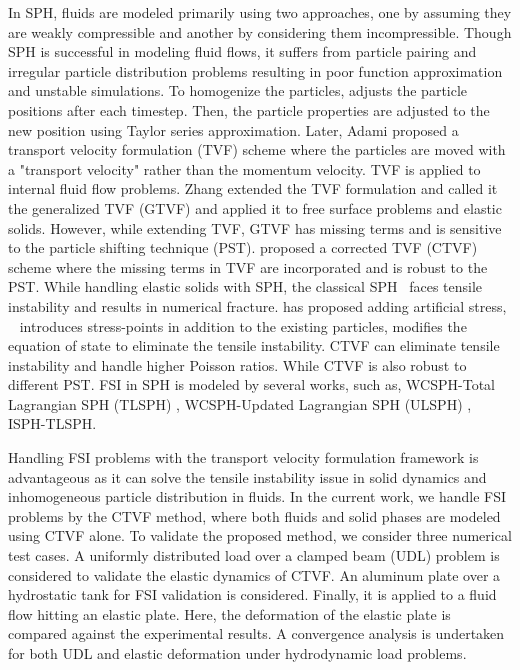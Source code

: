 \documentclass[10pt, conference]{FMFP2022}
\begin{document}
In SPH, fluids are modeled primarily using two approaches, one by assuming they
are weakly compressible and another by considering them incompressible. Though
SPH is successful in modeling fluid flows, it suffers from particle pairing and
irregular particle distribution problems resulting in poor function
approximation~\cite{rastelli2022implicit} and unstable simulations. To
homogenize the particles, \cite{xu2009accuracy} adjusts the particle positions
after each timestep. Then, the particle properties are adjusted to the new
position using Taylor series approximation. Later, Adami \cite{adami2013transport}
proposed a transport velocity formulation (TVF) scheme where the particles are
moved with a "transport velocity" rather than the momentum velocity. TVF is
applied to internal fluid flow problems. Zhang
\cite{zhang2017generalized} extended the TVF formulation and called it the
generalized TVF (GTVF) and applied it to free surface problems and elastic
solids. However, while extending TVF, GTVF has missing terms and is sensitive to
the particle shifting technique (PST). \cite{adepu2021corrected} proposed a
corrected TVF (CTVF) scheme where the missing terms in TVF are incorporated and
is robust to the PST. While handling elastic solids with SPH, the classical
SPH~\cite{gray2001sph} faces tensile instability and results in numerical
fracture. \cite{gray2001sph} has proposed adding artificial stress,
~\cite{chalk2020stress} introduces stress-points in addition to the existing
particles, \cite{sugiura2017extension} modifies the equation of state to
eliminate the tensile instability. CTVF can eliminate tensile instability and
handle higher Poisson ratios. While CTVF is also robust to different PST. FSI in
SPH is modeled by several works, such as, WCSPH-Total Lagrangian SPH (TLSPH)
\cite{zhan2019stabilized}, WCSPH-Updated Lagrangian SPH (ULSPH)
\cite{antoci2007numerical}, ISPH-TLSPH\cite{salehizadeh2022coupled}.

Handling FSI problems with the transport velocity formulation framework is
advantageous as it can solve the tensile instability issue in solid dynamics and
inhomogeneous particle distribution in fluids. In the current work, we handle
FSI problems by the CTVF method, where both fluids and solid phases are modeled
using CTVF alone. To validate the proposed method, we consider three numerical
test cases. A uniformly distributed load over a clamped beam (UDL) problem is
considered to validate the elastic dynamics of CTVF. An aluminum plate over a
hydrostatic tank for FSI validation is considered. Finally, it is applied to a
fluid flow hitting an elastic plate. Here, the deformation of the elastic
plate is compared against the experimental results. A convergence analysis is
undertaken for both UDL and elastic deformation under hydrodynamic load
problems.
\end{document}
